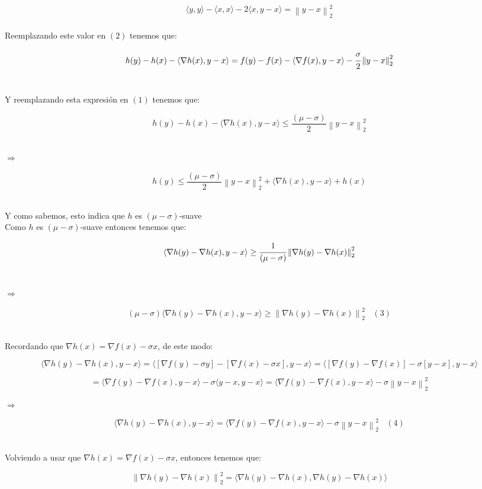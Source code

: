 \documentclass[11pt]{article}
\begin{document}
\[ \langle y,y \rangle - \langle x,x \rangle - 2 \langle x,y-x \rangle = \left\| y-x \right\|_2^2 \] \\

Reemplazando este valor en $ (2) $ tenemos que: \

\[ h(y) - h(x) - \langle \nabla h(x),y-x \rangle = f(y) - f(x) - \langle \nabla f(x),y-x \rangle - \cfrac{\sigma}{2} \left\| y-x \right\|_2^2 \] \

Y reemplazando esta expresión en $ (1) $ tenemos que:

\[ h(y) - h(x) - \langle \nabla h(x),y-x \rangle  \leq \frac{(\mu - \sigma)}{2} \left\| y-x \right\|_2^2 \] \

$ \Rightarrow $ 

\[ h(y) \leq \frac{(\mu - \sigma)}{2} \left\| y-x \right\|_2^2 + \langle \nabla h(x),y-x \rangle + h(x) \] \

Y como sabemos, esto indica que $ h $ es $ (\mu - \sigma)$-suave \\

Como $ h $ es $ (\mu - \sigma)$-suave entonces tenemos que: 

\[ \langle \nabla h(y) - \nabla h(x), y - x \rangle \geq \cfrac{1}{(\mu - \sigma)} \left\| \nabla h(y) - \nabla h(x) \right\|_2^2  \] \

$ \Rightarrow $ 

\[ (\mu - \sigma) \langle \nabla h(y) - \nabla h(x), y - x \rangle \geq  \left\| \nabla h(y) - \nabla h(x) \right\|_2^2 \ \ \ \ (3) \] \

Recordando que $ \nabla h(x) = \nabla f(x) - \sigma x $, de este modo:

\[ \langle \nabla h(y) - \nabla h(x), y - x \rangle = \langle [\nabla f(y) - \sigma y] - [\nabla f(x) - \sigma x], y - x \rangle = \langle [\nabla f(y) - \nabla f(x)] - \sigma[y-x] , y - x \rangle \]

\[ = \langle \nabla f(y) - \nabla f(x) , y - x \rangle - \sigma \langle y-x , y - x \rangle = \langle \nabla f(y) - \nabla f(x) , y - x \rangle -  \sigma \left\| y-x \right\|_2^2 \]

$ \Rightarrow $ \

\[ \langle \nabla h(y) - \nabla h(x), y - x \rangle = \langle \nabla f(y) - \nabla f(x) , y - x \rangle -  \sigma \left\| y-x \right\|_2^2 \ \ \ \ (4) \] \

Volviendo a usar que $ \nabla h(x) = \nabla f(x) - \sigma x $, entonces tenemos que: \

\[ \left\| \nabla h(y) - \nabla h(x) \right\|_2^2 = \langle \nabla h(y) - \nabla h(x),\nabla h(y) - \nabla h(x) \rangle  \]
\end{document}
